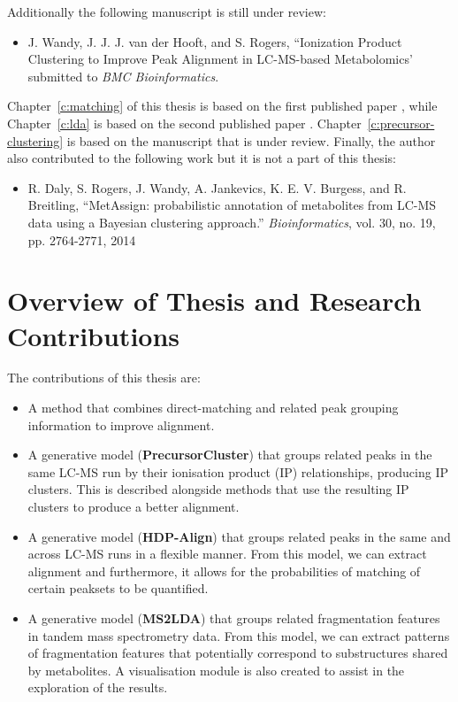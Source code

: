 Additionally the following manuscript is still under review:

\begin{itemize}
\item J. Wandy, J. J. J. van der Hooft, and S. Rogers, ``Ionization Product Clustering to Improve Peak Alignment in LC-MS-based Metabolomics' submitted to \textit{BMC Bioinformatics}.
\end{itemize}

Chapter~\ref{c:matching} of this thesis is based on the first published paper \cite{wandy2015incorporating}, while Chapter~\ref{c:lda} is based on the second published paper \cite{vanderHooft29112016}. Chapter~\ref{c:precursor-clustering} is based on the manuscript that is under review. Finally, the author also contributed to the following work \cite{Daly2014} but it is not a part of this thesis:

\begin{itemize}
\item R. Daly, S. Rogers, J. Wandy, A. Jankevics, K. E. V. Burgess, and R. Breitling, ``MetAssign: probabilistic annotation of metabolites from LC-MS data using a Bayesian clustering approach.'' \textit{Bioinformatics}, vol. 30, no. 19, pp. 2764-2771, 2014
\end{itemize}

\section{Overview of Thesis and Research Contributions}

The contributions of this thesis are:

\begin{itemize}
\item A method that combines direct-matching and related peak grouping information to improve alignment.
\item A generative model (\textbf{PrecursorCluster}) that groups related peaks in the same LC-MS run by their ionisation product (IP) relationships, producing IP clusters. This is described alongside methods that use the resulting IP clusters to produce a better alignment.
\item A generative model (\textbf{HDP-Align}) that groups related peaks in the same and across LC-MS runs in a flexible manner. From this model, we can extract alignment and furthermore, it allows for the probabilities of matching of certain peaksets to be quantified.
\item A generative model (\textbf{MS2LDA}) that groups related fragmentation features in tandem mass spectrometry data. From this model, we can extract patterns of fragmentation features that potentially correspond to substructures shared by metabolites. A visualisation module is also created to assist in the exploration of the results.
\end{itemize}

